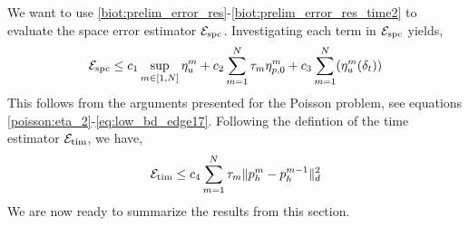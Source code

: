 \\
\\
We want to use \eqref{biot:prelim_error_res}-\eqref{biot:prelim_error_res_time2} to evaluate the space error estimator $\mathcal{E}_{\textnormal{spc}}$. Investigating each term in $\mathcal{E}_{\textnormal{spc}}$ yields, 
\begin{align}
\mathcal{E}_{\textnormal{spc}} \leq c_1 \sup_{m \in [1,N]} \eta^m_u  + c_2 \sum_{m=1}^N \tau_m \eta^m_{p,0} + c_3\sum_{m=1}^N (\eta^m_u(\delta_t))
\end{align}
This follows from the arguments presented for the Poisson problem, see equations \eqref{poisson:eta_2}-\eqref{eq:low_bd_edge17}. Following the defintion of the time estimator $\mathcal{E}_{\textnormal{tim}}$, we have,
\begin{equation}
\mathcal{E}_{\textnormal{tim}} \leq c_4 \sum_{m=1}^N \tau_m \|p^m_h - p^{m-1}_h\|_d^2
\end{equation}
We are now ready to summarize the results from this section.
